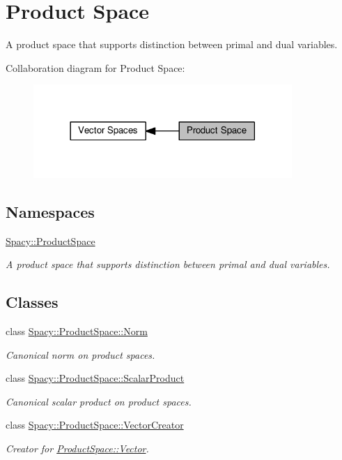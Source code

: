 \hypertarget{group__ProductSpaceGroup}{}\section{Product Space}
\label{group__ProductSpaceGroup}


A product space that supports distinction between primal and dual variables.  


Collaboration diagram for Product Space\+:
\nopagebreak
\begin{figure}[H]
\begin{center}
\leavevmode
\includegraphics[width=278pt]{group__ProductSpaceGroup}
\end{center}
\end{figure}
\subsection*{Namespaces}
\begin{DoxyCompactItemize}
\item 
 \hyperlink{namespaceSpacy_1_1ProductSpace}{Spacy\+::\+Product\+Space}
\begin{DoxyCompactList}\small\item\em A product space that supports distinction between primal and dual variables. \end{DoxyCompactList}\end{DoxyCompactItemize}
\subsection*{Classes}
\begin{DoxyCompactItemize}
\item 
class \hyperlink{classSpacy_1_1ProductSpace_1_1Norm}{Spacy\+::\+Product\+Space\+::\+Norm}
\begin{DoxyCompactList}\small\item\em Canonical norm on product spaces. \end{DoxyCompactList}\item 
class \hyperlink{classSpacy_1_1ProductSpace_1_1ScalarProduct}{Spacy\+::\+Product\+Space\+::\+Scalar\+Product}
\begin{DoxyCompactList}\small\item\em Canonical scalar product on product spaces. \end{DoxyCompactList}\item 
class \hyperlink{classSpacy_1_1ProductSpace_1_1VectorCreator}{Spacy\+::\+Product\+Space\+::\+Vector\+Creator}
\begin{DoxyCompactList}\small\item\em Creator for \hyperlink{classSpacy_1_1ProductSpace_1_1Vector}{Product\+Space\+::\+Vector}. \end{DoxyCompactList}\end{DoxyCompactItemize}
